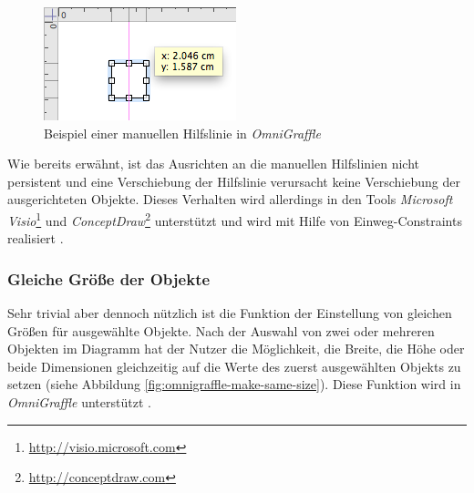 \begin{figure}[hbt]
    \centering
    \includegraphics{resources/omnigraffle-manual-guides.png}
    \caption{Beispiel einer manuellen Hilfslinie in \textit{OmniGraffle}}
    \label{fig:omnigraffle-manual-guides}
\end{figure}

Wie bereits erwähnt, ist das Ausrichten an die manuellen Hilfslinien nicht persistent und eine Verschiebung der Hilfslinie verursacht keine Verschiebung der ausgerichteten Objekte. Dieses Verhalten wird allerdings in den Tools \textit{Microsoft Visio}\footnote{\url{http://visio.microsoft.com}} und \textit{ConceptDraw}\footnote{\url{http://conceptdraw.com}} unterstützt und wird mit Hilfe von Einweg-Constraints realisiert \cite[S.20]{Maier12A-Pattern-based}.

\subsubsection{Gleiche Größe der Objekte}

Sehr trivial aber dennoch nützlich ist die Funktion der Einstellung von gleichen Größen für ausgewählte Objekte. Nach der Auswahl von zwei oder mehreren Objekten im Diagramm hat der Nutzer die Möglichkeit, die Breite, die Höhe oder beide Dimensionen gleichzeitig auf die Werte des zuerst ausgewählten Objekts zu setzen (siehe Abbildung \ref{fig:omnigraffle-make-same-size}). Diese Funktion wird in \textit{OmniGraffle} unterstützt \cite{Olsen10OmniGraffle}.

